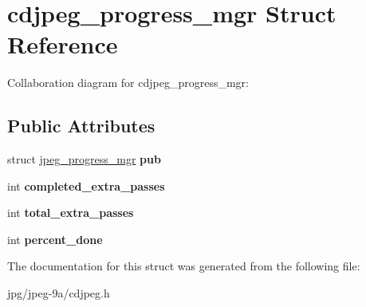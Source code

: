 \hypertarget{structcdjpeg__progress__mgr}{\section{cdjpeg\+\_\+progress\+\_\+mgr Struct Reference}
\label{structcdjpeg__progress__mgr}
}


Collaboration diagram for cdjpeg\+\_\+progress\+\_\+mgr\+:
\subsection*{Public Attributes}
\begin{DoxyCompactItemize}
\item 
\hypertarget{structcdjpeg__progress__mgr_a6303d12ac00b08da19794945793f983f}{struct \hyperlink{structjpeg__progress__mgr}{jpeg\+\_\+progress\+\_\+mgr} {\bfseries pub}}\label{structcdjpeg__progress__mgr_a6303d12ac00b08da19794945793f983f}

\item 
\hypertarget{structcdjpeg__progress__mgr_a6f5f9744a8fc43219bbb42d1757820e6}{int {\bfseries completed\+\_\+extra\+\_\+passes}}\label{structcdjpeg__progress__mgr_a6f5f9744a8fc43219bbb42d1757820e6}

\item 
\hypertarget{structcdjpeg__progress__mgr_a05c1a823d40d937b105e3ba2c13bc00d}{int {\bfseries total\+\_\+extra\+\_\+passes}}\label{structcdjpeg__progress__mgr_a05c1a823d40d937b105e3ba2c13bc00d}

\item 
\hypertarget{structcdjpeg__progress__mgr_a73fad2ed10876758edc5523d1cb10f8f}{int {\bfseries percent\+\_\+done}}\label{structcdjpeg__progress__mgr_a73fad2ed10876758edc5523d1cb10f8f}

\end{DoxyCompactItemize}


The documentation for this struct was generated from the following file\+:\begin{DoxyCompactItemize}
\item 
jpg/jpeg-\/9a/cdjpeg.\+h\end{DoxyCompactItemize}
